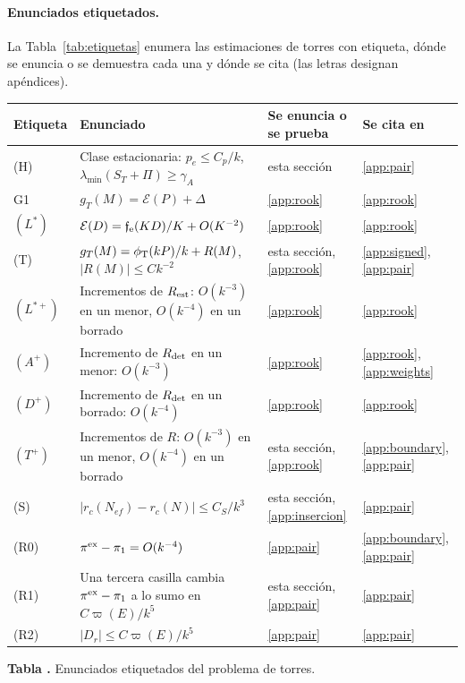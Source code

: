 \paragraph{Enunciados etiquetados.} La Tabla~\ref{tab:etiquetas} enumera las estimaciones de torres con
etiqueta, dónde se enuncia o se demuestra cada una y dónde se cita (las letras designan apéndices).
\begin{center}\small
\begin{tabular}{@{}L{.09\linewidth}L{.45\linewidth}L{.17\linewidth}L{.19\linewidth}@{}}
\toprule Etiqueta & Enunciado & Se enuncia o se prueba & Se cita en\\ \midrule
(H) & Clase estacionaria: $p_e\le C_p/k$, $\lambda_{\min}(S_T+\Pi)\ge\gamma_A$ & esta sección &
 \ref{app:pair}\\
G1 & $g_T(M)=\mathcal E(P)+\Delta$ & \ref{app:rook} & \ref{app:rook}\\
$(L^*)$ & $\mathcal E(D)=\mathfrak f_{\rm e}(KD)/K+O(K^{-2})$ & \ref{app:rook} & \ref{app:rook}\\
(T) & $g_T(M)=\phi_{\mathrm T}(kP)/k+R(M)$, $|R(M)|\le Ck^{-2}$ & esta sección, \ref{app:rook} &
 \ref{app:signed}, \ref{app:pair}\\
$(L^{*+})$ & Incrementos de $R_{\rm est}$: $O(k^{-3})$ en un menor, $O(k^{-4})$ en un borrado &
 \ref{app:rook} & \ref{app:rook}\\
$(A^+)$ & Incremento de $R_{\rm det}$ en un menor: $O(k^{-3})$ & \ref{app:rook} &
 \ref{app:rook}, \ref{app:weights}\\
$(D^+)$ & Incremento de $R_{\rm det}$ en un borrado: $O(k^{-4})$ & \ref{app:rook} & \ref{app:rook}\\
$(T^+)$ & Incrementos de $R$: $O(k^{-3})$ en un menor, $O(k^{-4})$ en un borrado &
 esta sección, \ref{app:rook} & \ref{app:boundary}, \ref{app:pair}\\
(S) & $|r_c(N_{ef})-r_c(N)|\le C_S/k^3$ & esta sección, \ref{app:insercion} & \ref{app:pair}\\
(R0) & $\pi^{\rm ex}-\pi_1=O(k^{-4})$ & \ref{app:pair} & \ref{app:boundary}, \ref{app:pair}\\
(R1) & Una tercera casilla cambia $\pi^{\rm ex}-\pi_1$ a lo sumo en $C\varpi(E)/k^5$ &
 esta sección, \ref{app:pair} & \ref{app:pair}\\
(R2) & $|D_r|\le C\varpi(E)/k^5$ & \ref{app:pair} & \ref{app:pair}\\
\bottomrule
\end{tabular}
\label{tab:etiquetas}\par\smallskip
\textbf{Tabla \thetable.} Enunciados etiquetados del problema de torres.
\end{center}
